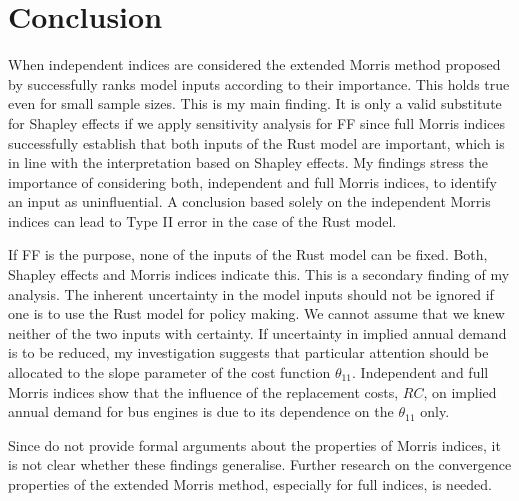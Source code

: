 \section{Conclusion} \label{conclusion}



When independent indices are considered the extended Morris method proposed by \citet{GM17} successfully ranks model inputs according to their importance. This holds true even for small sample sizes. This is my main finding. It is only a valid substitute for Shapley effects if we apply sensitivity analysis for FF since full Morris indices successfully establish that both inputs of the Rust model are important, which is in line with the interpretation based on Shapley effects. My findings stress the importance of considering both, independent and full Morris indices, to identify an input as uninfluential. A conclusion based solely on the independent Morris indices can lead to Type II error in the case of the Rust model.


If FF is the purpose, none of the inputs of the Rust model can be fixed. Both, Shapley effects and Morris indices indicate this. This is a secondary finding of my analysis. The inherent uncertainty in the model inputs should not be ignored if one is to use the Rust model for policy making. We cannot assume that we knew neither of the two inputs with certainty. If uncertainty in implied annual demand is to be reduced, my investigation suggests that particular attention should be allocated to the slope parameter of the cost function $\theta_{11}$. Independent and full Morris indices show that the influence of the replacement costs, $RC$, on implied annual demand for bus engines is due to its dependence on the $\theta_{11}$ only.


Since \citet{GM17} do not provide formal arguments about the properties of Morris indices, it is not clear whether these findings generalise. Further research on the convergence properties of the extended Morris method, especially for full indices, is needed.

